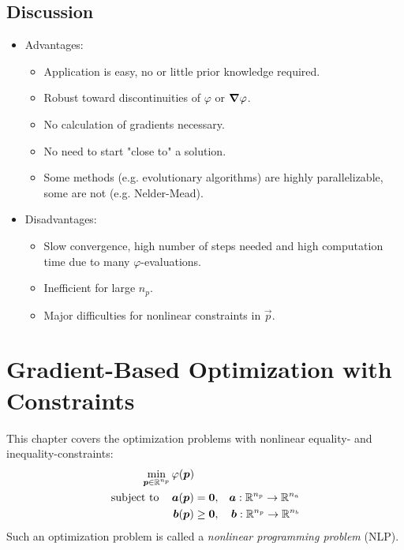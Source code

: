 	\section{Discussion}
		\begin{itemize}
			\item Advantages:
				\begin{itemize}
					\item Application is easy, no or little prior knowledge required.
					\item Robust toward discontinuities of \(\varphi\) or \(\grad{\varphi}\).
					\item No calculation of gradients necessary.
					\item No need to start "close to" a solution.
					\item Some methods (e.g. evolutionary algorithms) are highly parallelizable, some are not (e.g. Nelder-Mead).
				\end{itemize}
			\item Disadvantages:
				\begin{itemize}
					\item Slow convergence, high number of steps needed and high computation time due to many \(\varphi\)-evaluations.
					\item Inefficient for large \( n_p \).
					\item Major difficulties for nonlinear constraints in \(\vec{p}\).
				\end{itemize}
		\end{itemize}

\chapter{Gradient-Based Optimization with Constraints}
	This chapter covers the optimization problems with nonlinear equality- and inequality-constraints:
	\begin{align*}
		\min_{\bm{p} \in \mathbb{R}^{n_p}} &\, \varphi(\bm{p}) \\
		\mathrm{subject~to}\quad &\,
			\begin{alignedat}[t]{3}
				\bm{a}(\bm{p}) &= \bm{0},\quad & \bm{a} : \mathbb{R}^{n_p} \to \mathbb{R}^{n_a} \\
				\bm{b}(\bm{p}) &\geq \bm{0},\quad & \bm{b} : \mathbb{R}^{n_p} \to \mathbb{R}^{n_b}
			\end{alignedat}
	\end{align*}
	Such an optimization problem is called a \emph{nonlinear programming problem} (NLP).

